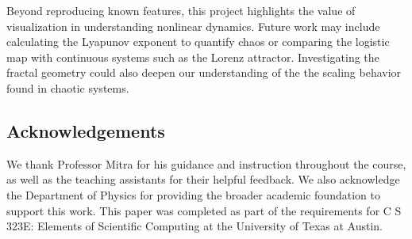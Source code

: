\documentclass[linenumbers, RNAAS, trackchanges]{aastex631}
\begin{document}
Beyond reproducing known features, this project highlights the value of
visualization in understanding nonlinear dynamics. Future work may include
calculating the Lyapunov exponent to quantify chaos or comparing the logistic
map with continuous systems such as the Lorenz attractor. Investigating the 
fractal geometry could also deepen our understanding of the the scaling
behavior found in chaotic systems.


\subsection{Acknowledgements}
We thank Professor Mitra for his guidance and instruction throughout the course,
as well as the teaching assistants for their helpful feedback. We also
acknowledge the Department of Physics for providing the broader academic
foundation to support this work. This paper was completed as part of the 
requirements for C S 323E: Elements of Scientific Computing at the University
of Texas at Austin.

\newpage


\end{document}
